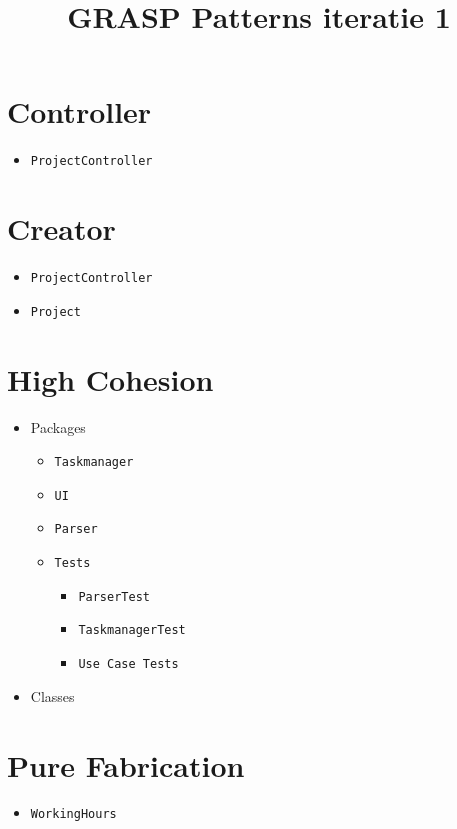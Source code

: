 \documentclass[11pt]{article}
\title{\textbf{GRASP Patterns iteratie 1}}
\author{}
\date{}
\begin{document}
\maketitle

\section{Controller}
\begin{itemize}
\item \texttt{ProjectController} 
\end{itemize}

\section{Creator}
\begin{itemize}
\item \texttt{ProjectController} 
\item \texttt{Project}
\end{itemize}

\section{High Cohesion}

\begin{itemize}
\item Packages
\begin{itemize}
\item \texttt{Taskmanager}
\item \texttt{UI}
\item \texttt{Parser}
\item \texttt{Tests}
\begin{itemize}
\item \texttt{ParserTest}
\item \texttt{TaskmanagerTest}
\item \texttt{Use Case Tests}
\end{itemize}

\end{itemize}

\item Classes
\end{itemize}

\section{Pure Fabrication}

\begin{itemize}
\item \texttt{WorkingHours} 

\end{itemize}
\end{document}
